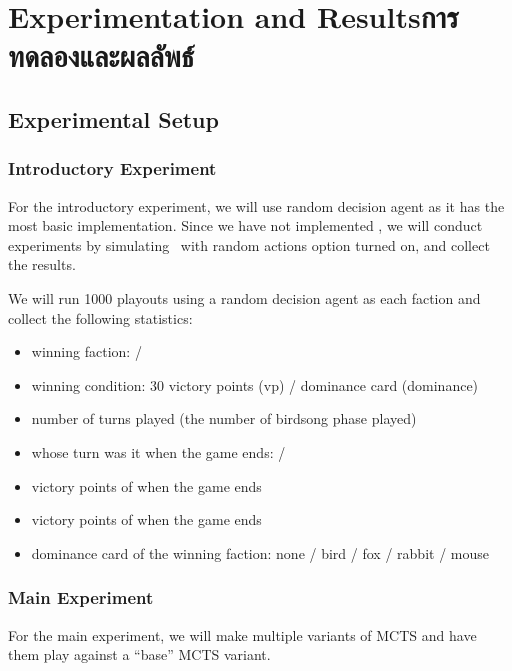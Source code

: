 \chapter{
    \ifenglish Experimentation and Results\else การทดลองและผลลัพธ์\fi
}



\section{Experimental Setup}

\subsection{Introductory Experiment}
For the introductory experiment, we will use random decision agent as it has the most basic implementation. Since we have not implemented \RootAI, we will conduct experiments by simulating \RootOurs \ with random actions option turned on, and collect the results. 

We will run 1000 \glspl{playout} using a random decision agent as each faction and collect the following statistics:
\begin{itemize}
    \item winning faction: \Marquise{} / \Eyrie
    \item winning condition: 30 victory points (vp) / dominance card (dominance)
    \item number of turns played (the number of birdsong phase played)
    \item whose turn was it when the game ends: \Marquise{} / \Eyrie
    \item victory points of \Marquise{} when the game ends
    \item victory points of \Eyrie{} when the game ends
    \item dominance card of the winning faction: none / bird / fox / rabbit / mouse
\end{itemize}

\subsection{Main Experiment}
For the main experiment, we will make multiple variants of MCTS and have them play against a ``base'' MCTS variant. 

